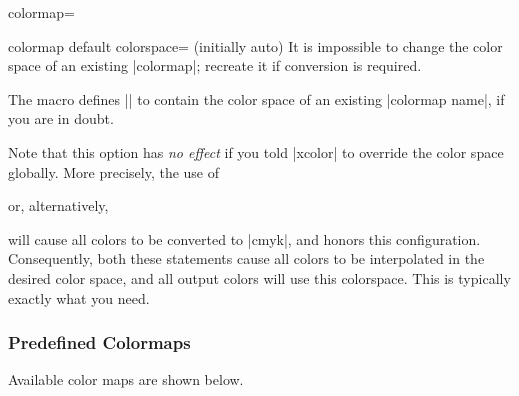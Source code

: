 \begin{pgfplotskey}{colormap=}
\begin{pgfplotskey}{colormap default colorspace= (initially auto)}
        It is impossible to change the color space of an existing |colormap|;
        recreate it if conversion is required.

        The macro \declareandlabel{\pgfplotscolormapgetcolorspace}
        defines |\pgfplotsretval| to contain the color space of an existing
        |colormap name|, if you are in doubt.

        Note that this option has \emph{no effect} if you told |xcolor| to
        override the color space globally. More precisely, the use of
\begin{codeexample}
\usepackage[cmyk]{xcolor}
\end{codeexample}
        or, alternatively,
\begin{codeexample}
\end{codeexample}
        will cause all colors to be converted to |cmyk|, and \PGFPlots{} honors
        this configuration. Consequently, both these statements cause all
        colors to be interpolated in the desired color space, and all output
        colors will use this colorspace. This is typically exactly what you
        need.
    \end{pgfplotskey}


    \subsubsection{Predefined Colormaps}

    Available color maps are shown below.
\end{pgfplotskey}

